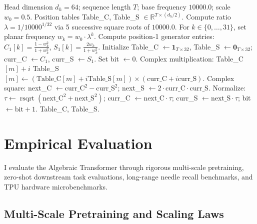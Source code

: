 \documentclass[11pt,a4paper]{article}
\theoremstyle{definition}
\newcommand{\rsqrt}{\operatorname{rsqrt}}
\begin{document}
\begin{algorithm}[H]
\caption{Geometric Cayley Position Rotation}
\label{alg:cayley}
\begin{algorithmic}[1]
\Require Head dimension $d_h = 64$; sequence length $T$; base frequency $10000.0$; scale $w_0 = 0.5$.
\Ensure Position tables Table\_C, Table\_S $\in \mathbb{R}^{T \times (d_h/2)}$.
\State Compute ratio $\lambda = 1 / 10000^{1/32}$ via 5 successive square roots of $10000.0$.
\State For $k \in \{0, \dots, 31\}$, set planar frequency $w_k = w_0 \cdot \lambda^k$.
\State Compute position-1 generator entries: $C_1[k] = \frac{1 - w_k^2}{1 + w_k^2}$, \quad $S_1[k] = \frac{2 w_k}{1 + w_k^2}$.
\State Initialize Table\_C $\leftarrow \mathbf{1}_{T \times 32}$, Table\_S $\leftarrow \mathbf{0}_{T \times 32}$; \quad curr\_C $\leftarrow C_1$, curr\_S $\leftarrow S_1$.
\State Set bit $\leftarrow 0$.
            \State Complex multiplication: Table\_C$[m] + i$ Table\_S$[m] \leftarrow (\text{Table\_C}[m] + i \text{Table\_S}[m]) \times (\text{curr\_C} + i \text{curr\_S})$.
        \EndIf
    \EndFor
    \State Complex square: next\_C $\leftarrow \text{curr\_C}^2 - \text{curr\_S}^2$; \quad next\_S $\leftarrow 2 \cdot \text{curr\_C} \cdot \text{curr\_S}$.
    \State Normalize: $\tau \leftarrow \rsqrt(\text{next\_C}^2 + \text{next\_S}^2)$; \quad curr\_C $\leftarrow \text{next\_C} \cdot \tau$; \quad curr\_S $\leftarrow \text{next\_S} \cdot \tau$; \quad bit $\leftarrow \text{bit} + 1$.
\EndWhile
\State \Return Table\_C, Table\_S.
\end{algorithmic}
\end{algorithm}

\section{Empirical Evaluation}
\label{sec:experiments}

I evaluate the Algebraic Transformer through rigorous multi-scale pretraining, zero-shot downstream task evaluations, long-range needle recall benchmarks, and TPU hardware microbenchmarks.

\subsection{Multi-Scale Pretraining and Scaling Laws}
\label{subsec:scaling}
\end{document}
